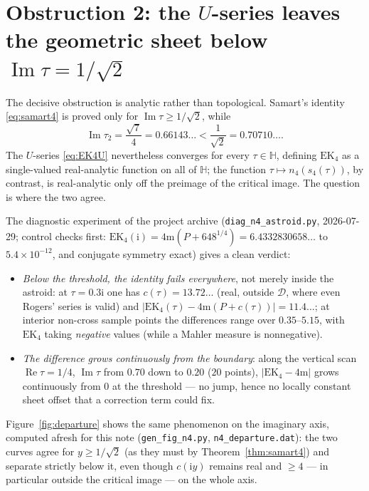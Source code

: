 \documentclass[11pt]{article}
\theoremstyle{definition}
\theoremstyle{remark}
\newcommand{\Hh}{\mathbb{H}}
\newcommand{\ii}{\mathrm{i}}
\newcommand{\ImT}{\operatorname{Im}}
\newcommand{\ReT}{\operatorname{Re}}
\newcommand{\m}{\mathrm{m}}
\begin{document}
\section{Obstruction 2: the \texorpdfstring{$U$}{U}-series leaves the
geometric sheet below \texorpdfstring{$\ImT\tau=1/\sqrt2$}{Im tau =
1/sqrt(2)}}\label{sec:sheet}

The decisive obstruction is analytic rather than topological. Samart's
identity \eqref{eq:samart4} is proved only for $\ImT\tau\ge1/\sqrt2$,
while
\[
  \ImT\tau_2=\frac{\sqrt7}4=0.66143\ldots<\frac1{\sqrt2}=0.70710\ldots .
\]
The $U$-series \eqref{eq:EK4U} nevertheless converges for every
$\tau\in\Hh$, defining $\mathrm{EK}_4$ as a single-valued real-analytic
function on all of $\Hh$; the function
$\tau\mapsto n_4(s_4(\tau))$, by contrast, is real-analytic only off the
preimage of the critical image. The question is where the two agree.

The diagnostic experiment of the project archive
(\texttt{diag\_n4\_astroid.py}, 2026-07-29; control checks first:
$\mathrm{EK}_4(\ii)=4\m(P+648^{1/4})=6.4332830658\ldots$ to
$5.4\times10^{-12}$, and conjugate symmetry exact) gives a clean
verdict:

\begin{itemize}
\item \emph{Below the threshold, the identity fails everywhere}, not
merely inside the astroid: at $\tau=0.3\ii$ one has
$c(\tau)=13.72\ldots$ (real, outside $\mathcal D$, where even Rogers'
series is valid) and $|\mathrm{EK}_4(\tau)-4\m(P+c(\tau))|=11.4\ldots$;
at interior non-cross sample points the differences range over
$0.35$--$5.15$, with $\mathrm{EK}_4$ taking \emph{negative} values
(while a Mahler measure is nonnegative).
\item \emph{The difference grows continuously from the boundary}: along
the vertical scan $\ReT\tau=1/4$, $\ImT\tau$ from $0.70$ down to $0.20$
($20$ points), $|\mathrm{EK}_4-4\m|$ grows continuously from $0$ at the
threshold --- no jump, hence no locally constant sheet offset that a
correction term could fix.
\end{itemize}

Figure~\ref{fig:departure} shows the same phenomenon on the imaginary
axis, computed afresh for this note (\texttt{gen\_fig\_n4.py},
\texttt{n4\_departure.dat}): the two curves agree for
$y\ge1/\sqrt2$ (as they must by Theorem~\ref{thm:samart4}) and separate
strictly below it, even though $c(\ii y)$ remains real and $\ge4$ --- in
particular outside the critical image --- on the whole axis.
\end{document}
